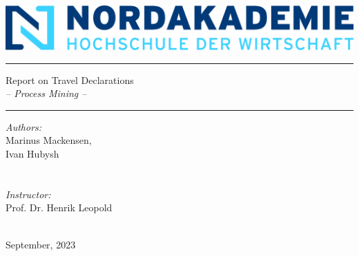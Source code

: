 \documentclass[twoside]{report}
\begin{document}

  \thispagestyle{empty}

  \begin{center}
    \includegraphics[scale=.28]{data/fig_nak}
    \\
    \vspace{1.5 cm}
    \vspace{1.5 cm}
    \hrule height 1 pt
    \vspace{1.5 cm}
    \LARGE  Report on Travel Declarations
    \\
    \vspace{.5 cm}
    \normalsize \it -- Process Mining --
    \vspace{1.5 cm}
    \hrule height 1 pt
  \end{center}

  \vspace{5 cm}

  \begin{center}
    \begin{minipage}{.9\textwidth}
    {\it Authors:}
      \\
      {\color{BlueViolet}
      Marinus Mackensen, \\
      Ivan Hubysh \\
      }
      \\
      \vspace{1 cm}
      \\
      {\it Instructor:}
      \\
      {\color{BlueViolet} Prof. Dr. Henrik Leopold}
    \end{minipage}
    \\
    \vspace{4cm}
    September, 2023
  \end{center}

  \thispagestyle{empty}
  \setcounter{page}{0}
  \clearpage
\end{document}
